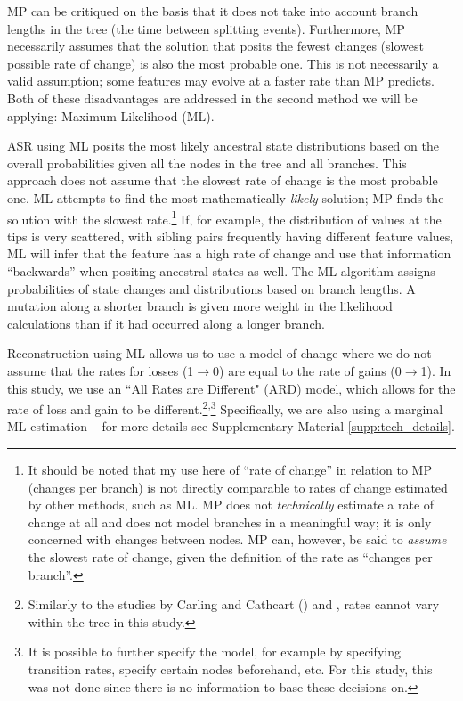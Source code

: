 \documentclass[12pt,letterpaper]{article}
\begin{document}
MP can be critiqued on the basis that it does not take into account branch lengths in the tree (the time between splitting events). Furthermore, MP necessarily assumes that the solution that posits the fewest changes (slowest possible rate of change) is also the most probable one. This is not necessarily a valid assumption; some features may evolve at a faster rate than MP predicts. Both of these disadvantages are addressed in the second method we will be applying: Maximum Likelihood (ML).

ASR using ML posits the most likely ancestral state distributions based on the overall probabilities given all the nodes in the tree and all branches. This approach does not assume that the slowest rate of change is the most probable one. ML attempts to find the most mathematically \textit{likely} solution; MP finds the solution with the slowest rate.\footnote{It should be noted that my use here of ``rate of change'' in relation to MP (changes per branch) is not directly comparable to rates of change estimated by other methods, such as ML. MP does not \textit{technically} estimate a rate of change at all and does not model branches in a meaningful way; it is only concerned with changes between nodes. MP can, however, be said to \textit{assume} the slowest rate of change, given the definition of the rate as ``changes per branch''.} If, for example, the distribution of values at the tips is very scattered, with sibling pairs frequently having different feature values, ML will infer that the feature has a high rate of change and use that information ``backwards'' when positing ancestral states as well. The ML algorithm assigns probabilities of state changes and distributions based on branch lengths. A mutation along a shorter branch is given more weight in the likelihood calculations than if it had occurred along a longer branch. 

Reconstruction using ML allows us to use a model of change where we do not assume that the rates for losses (1$\rightarrow$0) are equal to the rate of gains (0$\rightarrow$1). In this study, we use an ``All Rates are Different" (ARD) model, which allows for the rate of loss and gain to be different.\footnote{Similarly to the studies by Carling and Cathcart (\citeyear{carling2021reconstructing}) and \citet{goldstein_2022}, rates cannot vary within the tree in this study.}\textsuperscript{,}\footnote{It is possible to further specify the model, for example by specifying transition rates, specify certain nodes beforehand, etc. For this study, this was not done since there is no information to base these decisions on.} Specifically, we are also using a marginal ML estimation -- for more details see Supplementary Material \ref{supp:tech_details}.
\end{document}
